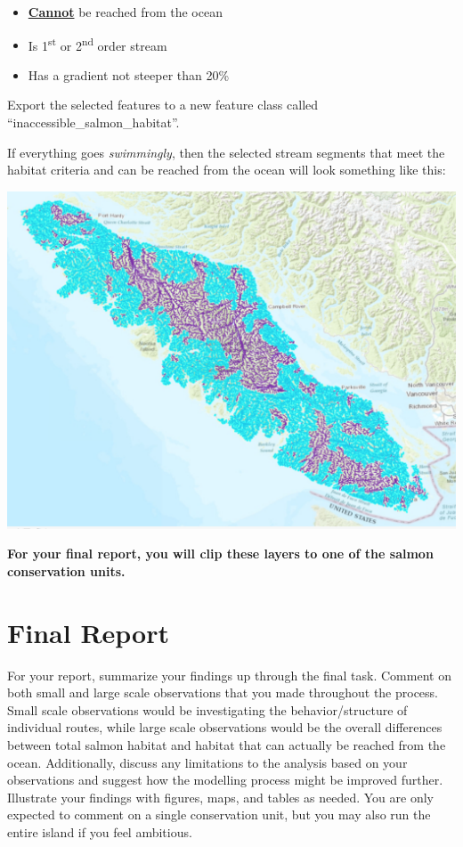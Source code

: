 \documentclass[
]{book}
\begin{document}
\begin{itemize}
\item
  \ul{\textbf{Cannot}} be reached from the ocean
\item
  Is 1\textsuperscript{st} or 2\textsuperscript{nd} order stream
\item
  Has a gradient not steeper than 20\%
\end{itemize}

Export the selected features to a new feature class called ``inaccessible\_salmon\_habitat''.

If everything goes \emph{swimmingly}, then the selected stream segments that meet the habitat criteria and can be reached from the ocean will look something like this:

\includegraphics[width=1\linewidth]{images/02-selected-streams}

\textbf{For your final report, you will clip these layers to one of the salmon conservation units.}

\hypertarget{final-report}{%
\section*{Final Report}\label{final-report}}

For your report, summarize your findings up through the final task. Comment on both small and large scale observations that you made throughout the process. Small scale observations would be investigating the behavior/structure of individual routes, while large scale observations would be the overall differences between total salmon habitat and habitat that can actually be reached from the ocean. Additionally, discuss any limitations to the analysis based on your observations and suggest how the modelling process might be improved further. Illustrate your findings with figures, maps, and tables as needed. You are only expected to comment on a single conservation unit, but you may also run the entire island if you feel ambitious.
\end{document}
